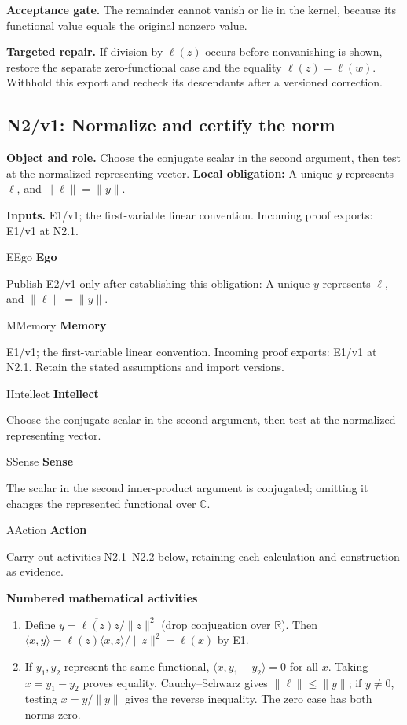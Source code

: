 \documentclass[preprint,12pt,aps,pra,showkeys,amsmath,amssymb,superscriptaddress,floatfix]{revtex4-2}
\theoremstyle{definition}
\theoremstyle{remark}
\newcommand{\mmfaculty}[3]{%
 \begin{mmfacultybox}{#1}{#2}
 {\sffamily\bfseries\color{MMBlue}#2}\par\smallskip #3
 \end{mmfacultybox}}
\newcommand{\field}[2]{\par\smallskip\noindent\textbf{#1.} #2\par}
\begin{document}
\field{Acceptance gate}{The remainder cannot vanish or lie in the kernel, because its functional
value equals the original nonzero value.}

\field{Targeted repair}{If division by \(\ell(z)\) occurs before nonvanishing is shown, restore
the separate zero-functional case and the equality \(\ell(z)=\ell(w)\).
Withhold this export and recheck its descendants after a versioned
correction.}

\clearpage

\subsection{N2/v1: Normalize and certify the norm}

\field{Object and role}{Choose the conjugate scalar in the second argument, then test at the
normalized representing vector. \textbf{Local obligation:} A unique
\(y\) represents \(\ell\), and \(\|\ell\|=\|y\|\).}

\field{Inputs}{E1/v1; the first-variable linear convention. Incoming proof exports:
E1/v1 at N2.1.}

\mmfaculty{E}{Ego}{Publish E2/v1 only after establishing this obligation: A unique \(y\)
represents \(\ell\), and \(\|\ell\|=\|y\|\).}

\mmfaculty{M}{Memory}{E1/v1; the first-variable linear convention. Incoming proof exports:
E1/v1 at N2.1. Retain the stated assumptions and import versions.}

\mmfaculty{I}{Intellect}{Choose the conjugate scalar in the second argument, then test at the
normalized representing vector.}

\mmfaculty{S}{Sense}{The scalar in the second inner-product argument is conjugated; omitting
it changes the represented functional over \(\mathbb C\).}

\mmfaculty{A}{Action}{Carry out activities N2.1--N2.2 below, retaining each calculation and
construction as evidence.}

\smallskip\noindent\textbf{Numbered mathematical activities}

\begin{enumerate}[label=N2.\arabic*,leftmargin=3.4em]

\item Define \(y=\overline{\ell(z)}z/\|z\|^2\) (drop conjugation over
\(\mathbb R\)). Then
\(\langle x,y\rangle=\ell(z)\langle x,z\rangle/\|z\|^2=\ell(x)\) by E1.

\item If \(y_1,y_2\) represent the same functional,
\(\langle x,y_1-y_2\rangle=0\) for all \(x\). Taking \(x=y_1-y_2\)
proves equality. Cauchy--Schwarz gives \(\|\ell\|\le\|y\|\); if
\(y\ne0\), testing \(x=y/\|y\|\) gives the reverse inequality. The zero
case has both norms zero.

\end{enumerate}
\end{document}
